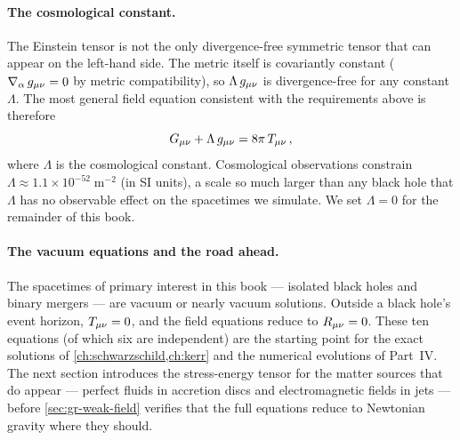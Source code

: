 \paragraph{The cosmological constant.}

The Einstein tensor is not the only divergence-free symmetric tensor that
can appear on the left-hand side.  The metric itself is covariantly constant
($\nabla_{\alpha}\,g_{\mu\nu} = 0$ by metric compatibility), so
$\Lambda\,g_{\mu\nu}$ is divergence-free for any constant $\Lambda$.  The most
general field equation consistent with the requirements above is therefore
%
\begin{equation}
  G_{\mu\nu} + \Lambda\,g_{\mu\nu} = 8\pi\,T_{\mu\nu} \,,
  \label{eq:efe-lambda}
\end{equation}
%
where $\Lambda$ is the cosmological constant.  Cosmological observations
constrain $\Lambda \approx 1.1 \times 10^{-52}\;\text{m}^{-2}$ (in SI
units), a scale so much larger than any black hole that $\Lambda$ has no
observable effect on the spacetimes we simulate.  We set $\Lambda = 0$ for
the remainder of this book.

\paragraph{The vacuum equations and the road ahead.}

The spacetimes of primary interest in this book --- isolated black holes and
binary mergers --- are vacuum or nearly vacuum solutions.  Outside a black
hole's event horizon, $T_{\mu\nu} = 0$, and the field equations reduce to
$R_{\mu\nu} = 0$.  These ten equations (of which six are independent) are the
starting point for the exact solutions of
\cref{ch:schwarzschild,ch:kerr} and the numerical evolutions of Part~IV.
The next section introduces the stress-energy tensor for the matter sources
that do appear --- perfect fluids in accretion discs and electromagnetic
fields in jets --- before \cref{sec:gr-weak-field} verifies that the full
equations reduce to Newtonian gravity where they should.
